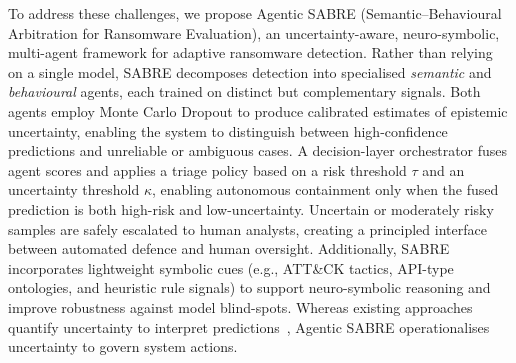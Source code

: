 \documentclass[lettersize,journal]{IEEEtran}
\begin{document}

\IEEEpubidadjcol

To address these challenges, we propose Agentic SABRE (Semantic–Behavioural Arbitration for Ransomware Evaluation), an uncertainty-aware, neuro-symbolic, multi-agent framework for adaptive ransomware detection. Rather than relying on a single model, SABRE decomposes detection into specialised \emph{semantic} and \emph{behavioural} agents, each trained on distinct but complementary signals. Both agents employ Monte Carlo Dropout to produce calibrated estimates of epistemic uncertainty, enabling the system to distinguish between high-confidence predictions and unreliable or ambiguous cases. A decision-layer orchestrator fuses agent scores and applies a triage policy based on a risk threshold \(\tau\) and an uncertainty threshold \(\kappa\),
enabling autonomous containment only when the fused prediction is both
high-risk and low-uncertainty. Uncertain or moderately risky samples are safely escalated to human analysts, creating a principled interface between automated defence and human oversight. Additionally, SABRE incorporates lightweight symbolic cues (e.g., ATT\&CK tactics, API-type ontologies, and heuristic rule signals) to support neuro-symbolic reasoning and improve robustness against model blind-spots. Whereas existing approaches quantify uncertainty to interpret predictions~\cite{kabuye2025explainable}, Agentic SABRE operationalises uncertainty to govern system actions.
\end{document}
